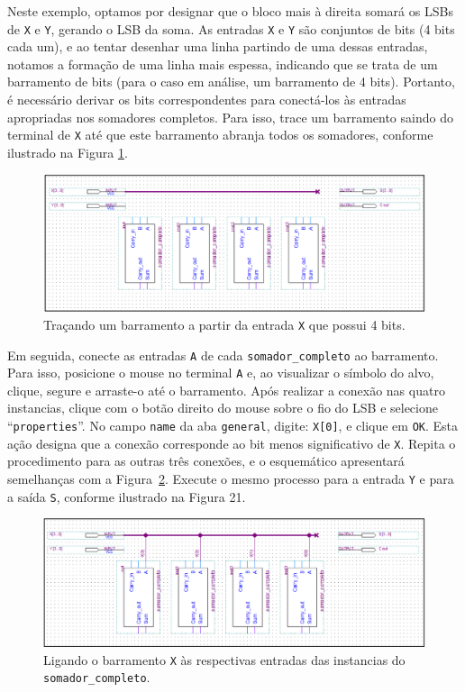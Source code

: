 \documentclass[12pt,a4paper]{article}
\begin{document}
Neste exemplo, optamos por designar que o bloco mais à direita somará os LSBs de \texttt{X} e \texttt{Y}, gerando o LSB da soma. As entradas \texttt{X} e \texttt{Y} são conjuntos de bits (4 bits cada um), e ao tentar desenhar uma linha partindo de uma dessas entradas, notamos a formação de uma linha mais espessa, indicando que se trata de um barramento de bits (para o caso em análise, um barramento de 4 bits). Portanto, é necessário derivar os bits correspondentes para conectá-los às entradas apropriadas nos somadores completos. Para isso, trace um barramento saindo do terminal de \texttt{X} até que este barramento abranja todos os somadores, conforme ilustrado na Figura \ref{fig:19}.

\begin{figure}[htbp!]
    \centering
    \includegraphics[width=\textwidth]{./figs/fig19.png}
    \caption{Traçando um barramento a partir da entrada \texttt{X} que possui 4 bits.}
    \label{fig:19}
\end{figure}

Em seguida, conecte as entradas \texttt{A} de cada \texttt{somador\_completo} ao barramento. Para isso, posicione o mouse no terminal \texttt{A} e, ao visualizar o símbolo do alvo, clique, segure e arraste-o até o barramento. Após realizar a conexão nas quatro instancias, clique com o botão direito do mouse sobre o fio do LSB e selecione ``\texttt{properties}''. No campo \texttt{name} da aba \texttt{general}, digite: \texttt{X[0]}, e clique em \texttt{OK}. Esta ação designa que a conexão corresponde ao bit menos significativo de \texttt{X}. Repita o procedimento para as outras três conexões, e o esquemático apresentará semelhanças com a Figura~\ref{fig:20}. Execute o mesmo processo para a entrada \texttt{Y} e para a saída \texttt{S}, conforme ilustrado na Figura 21.

\begin{figure}[htbp!]
    \centering
    \includegraphics[width=\textwidth]{./figs/fig20.png}
    \caption{Ligando o barramento \texttt{X} às respectivas entradas das instancias do \texttt{somador\_completo}.}
    \label{fig:20}
\end{figure}
\end{document}
